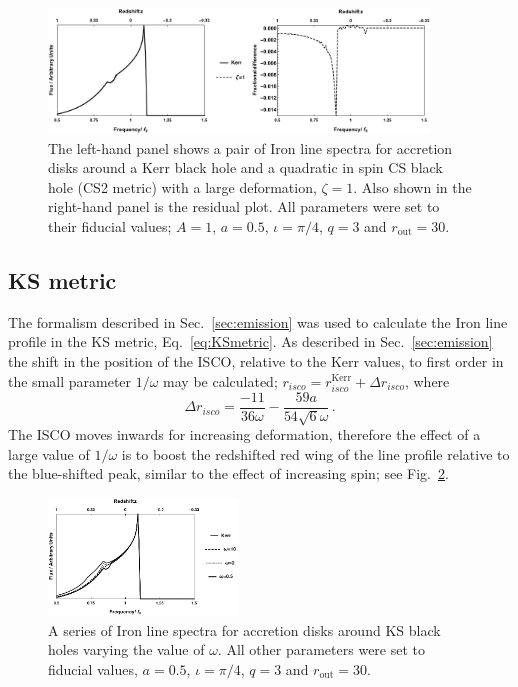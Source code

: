 \begin{figure}[t]
 \centering
 \includegraphics[trim=0cm 0cm 0cm 0cm, width=0.9\textwidth]{CS2IronLines.pdf}
 \caption{The left-hand panel shows a pair of Iron line spectra for accretion disks around a Kerr black hole and a quadratic in spin CS black hole (CS2 metric) with a large deformation, $\zeta=1$. Also shown in the right-hand panel is the residual plot. All parameters were set to their fiducial values; $A=1$, $a=0.5$, $\iota=\pi/4$, $q=3$ and $r_{\textrm{out}}=30$.}
 \label{fig:CS1IronLines}
\end{figure}

\subsection{KS metric}\label{subsubsec:KSres}
The formalism described in Sec.\ \ref{sec:emission} was used to calculate the Iron line profile in the KS metric, Eq.\ \ref{eq:KSmetric}. As described in Sec.\ \ref{sec:emission} the shift in the position of the ISCO, relative to the Kerr values, to first order in the small parameter $1/\omega$ may be calculated; $r_{isco}=r_{isco}^{\textrm{Kerr}}+\Delta r_{isco}$, where 
\begin{equation} \Delta r_{isco}=\frac{-11}{36\omega}-\frac{59a}{54\sqrt{6}\omega}\, .  \end{equation}
The ISCO moves inwards for increasing deformation, therefore the effect of a large value of $1/\omega$ is to boost the redshifted red wing of the line profile relative to the blue-shifted peak, similar to the effect of increasing spin; see Fig.\ \ref{fig:KSIronLines}. 

\begin{figure}[h]
 \centering
 \includegraphics[trim=0cm 0cm 0cm 0cm, width=0.45\textwidth]{KSIronLines.pdf}
 \caption{A series of Iron line spectra for accretion disks around KS black holes varying the value of $\omega$. All other parameters were set to fiducial values, $a=0.5$, $\iota=\pi/4$, $q=3$ and $r_{\textrm{out}}=30$.}
 \label{fig:KSIronLines}
\end{figure}

